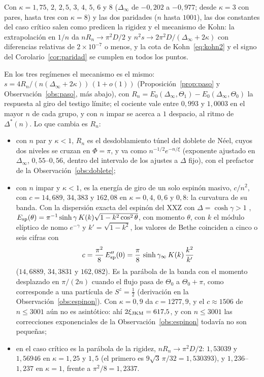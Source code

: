 \documentclass[11pt,a4paper]{article}
\theoremstyle{remark}
\begin{document}
Con $\kappa=1{,}75$, $2$, $2{,}5$, $3$, $4$, $5$, $6$ y $8$ ($\Delta_\infty$ de $-0{,}202$ a
$-0{,}977$; desde $\kappa=3$ con pares, hasta tres con $\kappa=8$) y las dos paridades ($n$ hasta
$1001$), las dos constantes del caso crítico salen como predicen la rigidez y el mecanismo de
Kohn: la extrapolación en $1/n$ da $nR_n\to\pi^2D/2$ y $n^2s\to2\pi^2D/(\Delta_\infty+2\kappa)$
con diferencias relativas de $2\times10^{-7}$ o menos, y la cota de Kohn~\eqref{eq:kohn2} y el
signo del Corolario~\ref{cor:paridad} se cumplen en todos los puntos.

En los tres regímenes el mecanismo es el mismo: $s=4R_n/(n(\Delta_\infty+2\kappa))\,(1+o(1))$
(Proposición~\ref{prop:paso} y Observación~\ref{obs:paso}, más abajo), con
$R_n=E_0(\Delta_\infty,\Theta_1)-E_0(\Delta_\infty,\Theta_0)$ la respuesta al giro del testigo
límite; el cociente vale entre $0{,}993$ y $1{,}0003$ en el mayor $n$ de cada grupo, y con $n$
impar se acerca a $1$ despacio, al ritmo de $\Delta^\ast(n)$. Lo que cambia
es $R_n$:
\begin{itemize}
\item con $n$ par y $\kappa<1$, $R_n$ es el desdoblamiento túnel del doblete de Néel, cuyos dos
  niveles se cruzan en $\Phi=\pi$, y va como $n^{-1/2}e^{-n/\xi}$ (exponente ajustado en
  $\Delta_\infty$, $0{,}55$--$0{,}56$, dentro del intervalo de los ajustes a $\Delta$ fijo), con el
  prefactor de la Observación~\ref{obs:doblete};
\item con $n$ impar y $\kappa<1$, es la energía de giro de un solo espinón masivo, $c/n^2$, con
  $c=14{,}689$, $34{,}383$ y $162{,}08$ en $\kappa=0{,}4$, $0{,}6$ y $0{,}8$: la curvatura de su
  banda. Con la dispersión exacta del espinón del XXZ con $\Delta=\cosh\gamma>1$
  \cite{des-cloizeaux-gaudin,jkm},
  $E_{\rm sp}(\theta)=\pi^{-1}\sinh\gamma\,K(k)\sqrt{1-k^2\cos^2\theta}$, con momento $\theta$, con $k$ el módulo elíptico de nomo
  $e^{-\gamma}$ y $k'=\sqrt{1-k^2}$, los valores de Bethe coinciden a cinco o seis cifras con
  \begin{equation}\label{eq:espinon}
    c=\frac{\pi^2}8\,E_{\rm sp}''(0)=\frac\pi8\,\sinh\gamma_\infty\,K(k)\,\frac{k^2}{k'}
  \end{equation}
  ($14{,}6889$, $34{,}3831$ y $162{,}082$). Es la parábola de la banda con el momento desplazado
  en $\pi/(2n)$ cuando el flujo pasa de $\Theta_0$ a $\Theta_0+\pi$, como corresponde a una
  partícula de $S^z=\tfrac12$ (derivación en la Observación~\ref{obs:espinon}). Con $\kappa=0{,}9$
  da $c=1277{,}9$, y el $c\approx1506$ de $n\le3001$ aún no es asintótico: ahí
  $2\xi_{\rm JKM}=617{,}5$, y con $n\le3001$ las correcciones exponenciales de la
  Observación~\ref{obs:espinon} todavía no son pequeñas;
\item en el caso crítico es la parábola de la rigidez, $nR_n\to\pi^2D/2$: $1{,}53039$ y
  $1{,}56946$ en $\kappa=1{,}25$ y $1{,}5$ (el primero es $9\sqrt3\,\pi/32=1{,}530393$), y $1{,}236$--$1{,}237$ en $\kappa=1$, frente a
  $\pi^2/8=1{,}2337$.
\end{itemize}
\end{document}
